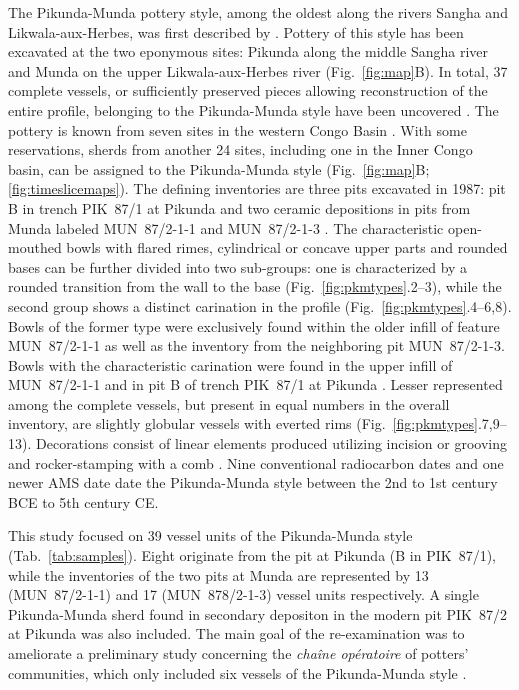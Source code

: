 \documentclass[smallextended,natbib]{svjour3}       %
\begin{document}
The Pikunda-Munda pottery style, among the oldest along the rivers Sangha and Likwala-aux-Herbes, was first described by \citet{Eggert.1992}. Pottery of this style has been excavated at the two eponymous sites: Pikunda along the middle Sangha river and Munda on the upper Likwala-aux-Herbes river (Fig.~\ref{fig:map}B). In total, 37 complete vessels, or sufficiently preserved pieces allowing reconstruction of the entire profile, belonging to the Pikunda-Munda style have been uncovered \citep[114--115]{Seidensticker.2021e}. The pottery is known from seven sites in the western Congo Basin \citep[119--120 Fig.~49]{Seidensticker.2021e}. With some reservations, sherds from another 24 sites, including one in the Inner Congo basin, can be assigned to the Pikunda-Munda style (Fig.~\ref{fig:map}B; \ref{fig:timeslicemaps}). The defining inventories are three pits excavated in 1987: pit B in trench PIK~87/1 at Pikunda \citep[288--300]{Seidensticker.2021e} and two ceramic depositions in pits from Munda labeled MUN~87/2-1-1 and MUN~87/2-1-3 \citep[321--335]{Seidensticker.2021e}. The characteristic open-mouthed bowls with flared rimes, cylindrical or concave upper parts and rounded bases \citep[311-314]{Eggert.1993} can be further divided into two sub-groups: one is characterized by a rounded transition from the wall to the base (Fig.~\ref{fig:pkmtypes}.2--3), while the second group shows a distinct carination in the profile (Fig.~\ref{fig:pkmtypes}.4--6,8). Bowls of the former type were exclusively found within the older infill of feature MUN~87/2-1-1 as well as the inventory from the neighboring pit MUN~87/2-1-3. Bowls with the characteristic carination were found in the upper infill of MUN~87/2-1-1 and in pit B of trench PIK~87/1 at Pikunda \citep[115--117]{Seidensticker.2021e}. Lesser represented among the complete vessels, but present in equal numbers in the overall inventory, are slightly globular vessels with everted rims (Fig.~\ref{fig:pkmtypes}.7,9--13). Decorations consist of linear elements produced utilizing incision or grooving and rocker-stamping with a comb \citep[362 App.~4.12]{Seidensticker.2021e}. Nine conventional radiocarbon dates \citep[117 Fig.~48, 355--356 App.~2]{Seidensticker.2021e} and one newer AMS date \citep[Tab.~2: RICH-30864]{Seidensticker.2024} date the Pikunda-Munda style between the 2nd to 1st century BCE to 5th century CE.

This study focused on 39 vessel units of the Pikunda-Munda style (Tab.~\ref{tab:samples}). Eight originate from the pit at Pikunda (B in PIK~87/1), while the inventories of the two pits at Munda are represented by 13 (MUN~87/2-1-1) and 17 (MUN~878/2-1-3) vessel units respectively. A single Pikunda-Munda sherd found in secondary depositon in the modern pit PIK~87/2 at Pikunda was also included. The main goal of the re-examination was to ameliorate a preliminary study concerning the \textit{chaîne opératoire} of potters' communities, which only included six vessels of the Pikunda-Munda style \citep[45--73]{Seidensticker.2021e}.
\end{document}
